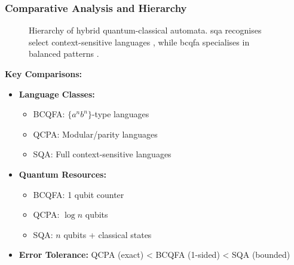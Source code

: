 \subsubsection*{Comparative Analysis and Hierarchy}
\begin{figure}[h]
\centering
{}
\caption{Hierarchy of hybrid quantum-classical automata. \gls{sqa} recognises select context-sensitive languages \cite{zheng2012two}, while \gls{bcqfa} specialises in balanced patterns \cite{ambainis1998}.}
\label{fig:hybrid-hierarchy}
\end{figure}

\textbf{Key Comparisons:}
\begin{itemize}
    \item \textbf{Language Classes:}
    \begin{itemize}
        \item BCQFA: $\{a^nb^n\}$-type languages
        \item QCPA: Modular/parity languages
        \item SQA: Full context-sensitive languages
    \end{itemize}
    \item \textbf{Quantum Resources:}
    \begin{itemize}
        \item BCQFA: 1 qubit counter
        \item QCPA: $\log n$ qubits
        \item SQA: $n$ qubits + classical states
    \end{itemize}
    \item \textbf{Error Tolerance:} QCPA (exact) < BCQFA (1-sided) < SQA (bounded)
\end{itemize}